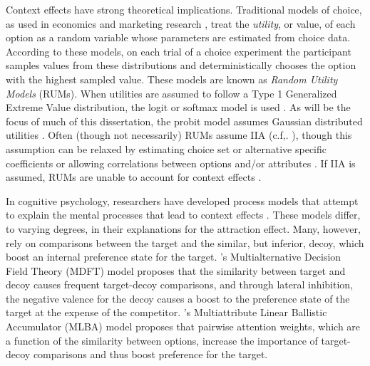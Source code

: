 Context effects have strong theoretical implications. Traditional models of choice, as used in economics and marketing research \parencite{mcfadden2001economic}, treat the \textit{utility}, or value, of each option as a random variable whose parameters are estimated from choice data. According to these models, on each trial of a choice experiment the participant samples values from these distributions and deterministically chooses the option with the highest sampled value. These models are known as \textit{Random Utility Models} (RUMs). When utilities are assumed to follow a Type 1 Generalized Extreme Value distribution, the logit or softmax model is used \parencite{gensch1979multinomial}. As will be the focus of much of this dissertation, the probit model assumes Gaussian distributed utilities \parencite{bolduc1999practical}. Often (though not necessarily) RUMs assume IIA (c.f,. \textcite{paetzUtilityIndependenceIIA2018}), though this assumption can be relaxed by estimating choice set or alternative specific coefficients \parencite{rooderkerk2011incorporating} or allowing correlations between options and/or attributes \parencite{haaijer1998utility}. If IIA is assumed, RUMs are unable to account for context effects \parencite{berkowitschRigorouslyTestingMultialternative2014b}. 

In cognitive psychology, researchers have developed process models that attempt to explain the mental processes that lead to context effects \parencite{trueblood2014multiattribute,roeMultialternativeDecisionField2001a,busemeyerCognitiveNeuralBases2019, usherLossAversionInhibition2004a,bhatiaAssociationsAccumulationPreference2013b,noguchiMultialternativeDecisionSampling2018a,wollschlager2NaryChoiceTree2012a,bergnerVAMPVotingAgent2019b,tverskyEliminationAspectsTheory1972,tversky1993context}. These models differ, to varying degrees, in their explanations for the attraction effect. Many, however, rely on comparisons between the target and the similar, but inferior, decoy, which boost an internal  preference state for the target. \textcite{roeMultialternativeDecisionField2001a}'s Multialternative Decision Field Theory (MDFT) model proposes that the similarity between target and decoy causes frequent target-decoy comparisons, and through lateral inhibition, the negative valence for the decoy causes a boost to the preference state of the target at the expense of the competitor. \textcite{trueblood2014multiattribute}'s Multiattribute Linear Ballistic Accumulator (MLBA) model proposes that pairwise attention weights, which are a function of the similarity between options, increase the importance of target-decoy comparisons and thus boost preference for the target. 

